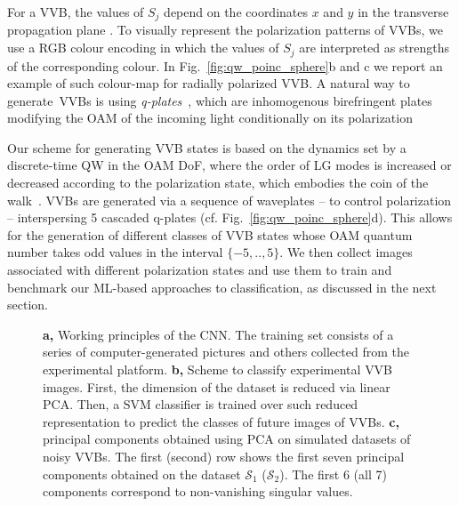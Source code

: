 For a \ac{VVB}, the values of $S_j$ depend on the coordinates $x$ and $y$ in the transverse propagation plane \cite{cardano2012polarization}.
To visually represent the polarization patterns of \acp{VVB}, we use a RGB colour encoding in which the values of $S_j$ are interpreted as strengths of the corresponding colour. In Fig.~\ref{fig:qw_poinc_sphere}b and c we report an example of such colour-map for radially polarized \ac{VVB}. A natural way to generate~\acp{VVB} is using \emph{q-plates}~\cite{marrucci2006optical,cardano2012polarization}, which are inhomogenous birefringent plates modifying the OAM of the incoming light conditionally on its polarization 



Our scheme for generating \ac{VVB} states is based on the dynamics set by a discrete-time QW in the OAM DoF, where the order of \ac{LG} modes is increased or decreased according to the polarization state, which embodies the coin of the walk~\cite{zhang2010implementation,goyal2013implementing,cardano2015quantum,innocenti2017quantum,giordani2019experimental}. 
\ac{VVB}s are generated via a sequence of waveplates -- to control polarization -- interspersing 5 cascaded q-plates (cf. Fig.~\ref{fig:qw_poinc_sphere}d). This allows for the generation of different classes of VVB states whose {OAM quantum number} takes odd values in the interval $\{-5,..,5\}$.
We then collect images associated with different polarization states and use them to train and benchmark our \ac{ML}-based approaches to classification, as discussed in the next section. 

\begin{figure}[b]
    \centering
    \caption{
    {\bf a,} 
    Working principles of the \ac{CNN}. The training set consists of a series of computer-generated pictures and others collected from the experimental platform.
    {\bf b,} 
    Scheme to classify experimental \ac{VVB} images. First, the dimension of the dataset is reduced via linear PCA. Then, a SVM classifier is trained over 
    such reduced representation 
    to predict the classes of future images of \ac{VVB}s. {\bf c,} principal components obtained using \ac{PCA} on simulated datasets of noisy \acp{VVB}. The first (second) row shows the first seven principal components obtained on the dataset $\mathcal S_1$ ($\mathcal S_2$). 
    The first 6 (all 7) components correspond to non-vanishing singular values. 
    }
    \label{fig:class_techniques}
\end{figure}



